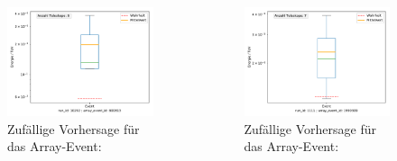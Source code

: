 \documentclass[aspectratio=1610, professionalfonts, 9pt]{beamer}
\begin{document}
  \begin{frame}
    \begin{columns}
      \begin{figure}
        \includegraphics[width=\textwidth]{pictures/pred2.pdf}
        \caption{Zufällige Vorhersage für das Array-Event:}
        \label{}
      \end{figure}
      \begin{figure}
        \includegraphics[width=\textwidth]{pictures/pred3.pdf}
        \caption{Zufällige Vorhersage für das Array-Event:}
        \label{}
      \end{figure}
    \end{columns}
  \end{frame}
\end{document}
